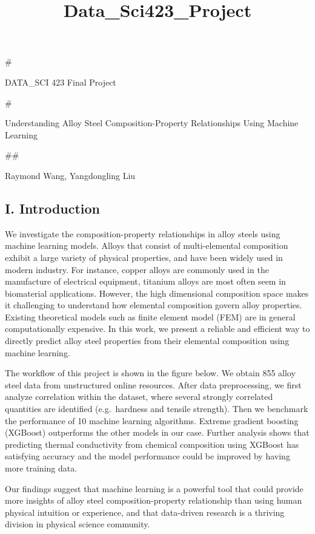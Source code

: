 \documentclass[11pt]{article}
\title{Data\_Sci423\_Project}
\begin{document}
    
    
    \maketitle
    
    

    
    \#

DATA\_SCI 423 \textbar{} Final Project

    \#

Understanding Alloy Steel Composition-Property Relationships Using
Machine Learning

    \#\#

Raymond Wang, Yangdongling Liu

    \hypertarget{i.-introduction}{%
\subsection{I. Introduction}\label{i.-introduction}}

    We investigate the composition-property relationships in alloy steels
using machine learning models. Alloys that consist of multi-elemental
composition exhibit a large variety of physical properties, and have
been widely used in modern industry. For instance, copper alloys are
commonly used in the manufacture of electrical equipment, titanium
alloys are most often seem in biomaterial applications. However, the
high dimensional composition space makes it challenging to understand
how elemental composition govern alloy properties. Existing theoretical
models such as finite element model (FEM) are in general computationally
expensive. In this work, we present a reliable and efficient way to
directly predict alloy steel properties from their elemental composition
using machine learning.

The workflow of this project is shown in the figure below. We obtain 855
alloy steel data from unstructured online resources. After data
preprocessing, we first analyze correlation within the dataset, where
several strongly correlated quantities are identified (e.g.~hardness and
tensile strength). Then we benchmark the performance of 10 machine
learning algorithms. Extreme gradient boosting (XGBoost) outperforms the
other models in our case. Further analysis shows that predicting thermal
conductivity from chemical composition using XGBoost has satisfying
accuracy and the model performance could be improved by having more
training data.

Our findings suggest that machine learning is a powerful tool that could
provide more insights of alloy steel composition-property relationship
than using human physical intuition or experience, and that data-driven
research is a thriving division in physical science community.
\end{document}
